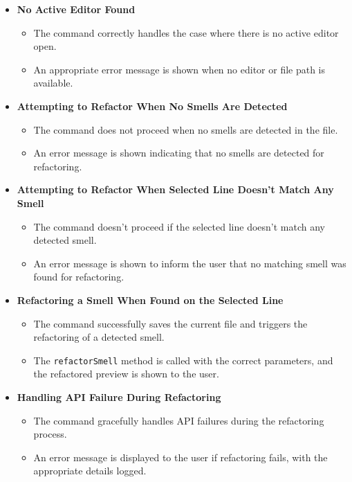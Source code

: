\documentclass[12pt, titlepage]{article}
\begin{document}
  \begin{itemize}
    \item \textbf{No Active Editor Found}
      \begin{itemize}
        \item The command correctly handles the case where there is
          no active editor open.
        \item An appropriate error message is shown when no editor or
          file path is available.
      \end{itemize}

    \item \textbf{Attempting to Refactor When No Smells Are Detected}
      \begin{itemize}
        \item The command does not proceed when no smells are
          detected in the file.
        \item An error message is shown indicating that no smells are
          detected for refactoring.
      \end{itemize}

    \item \textbf{Attempting to Refactor When Selected Line Doesn’t
      Match Any Smell}
      \begin{itemize}
        \item The command doesn't proceed if the selected line
          doesn't match any detected smell.
        \item An error message is shown to inform the user that no
          matching smell was found for refactoring.
      \end{itemize}

    \item \textbf{Refactoring a Smell When Found on the Selected Line}
      \begin{itemize}
        \item The command successfully saves the current file and
          triggers the refactoring of a detected smell.
        \item The \texttt{refactorSmell} method is called with the
          correct parameters, and the refactored preview is shown to the user.
      \end{itemize}

    \item \textbf{Handling API Failure During Refactoring}
      \begin{itemize}
        \item The command gracefully handles API failures during the
          refactoring process.
        \item An error message is displayed to the user if
          refactoring fails, with the appropriate details logged.
      \end{itemize}
  \end{itemize}
\end{document}
